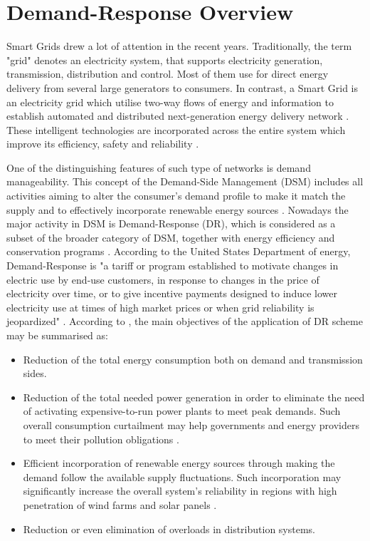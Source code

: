 \section{Demand-Response Overview}
Smart Grids drew a lot of attention in the recent years. Traditionally, the term "grid" denotes an electricity system, that supports electricity generation, transmission, distribution and control. Most of them use for direct energy delivery from several large generators to consumers. In contrast, a Smart Grid is an electricity grid which utilise two-way flows of energy and information to establish automated and distributed next-generation energy delivery network \cite{Fang2012}. These intelligent technologies are incorporated across the entire system which improve its efficiency, safety and reliability \cite{Gao2012}. 

One of the distinguishing features of such type of networks is demand manageability. This concept of the Demand-Side Management (DSM) includes all activities aiming to alter the consumer's demand profile to make it match the supply and to effectively incorporate renewable energy sources \cite{Alizadeh2012}. Nowadays the major activity in DSM is Demand-Response (DR), which is considered as a subset of the broader category of DSM, together with energy efficiency and conservation programs \cite{Palensky2011}. According to the United States Department of energy, Demand-Response is "a tariff or program established to motivate changes in electric use by end-use customers, in response to changes in the price of electricity over time, or to give incentive payments designed to induce lower electricity use at times of high market prices or when grid reliability is jeopardized" \cite{DepartmentofEnergyUSA2006}. According to \cite{Vardakas2015}, the main objectives of the application of DR scheme may be summarised as:
\begin{itemize}
    \item Reduction of the total energy consumption both on demand and transmission sides.
    \item Reduction of the total needed power generation in order to eliminate the need of activating expensive-to-run power plants to meet peak demands. Such overall consumption curtailment may help governments and energy providers to meet their pollution obligations \cite{DepartmentofEnergyUSA2006, Shishlov2016, UnitedNations/FrameworkConventiononClimateChange2015}.
    \item Efficient incorporation of renewable energy sources through making the demand follow the available supply fluctuations. Such incorporation may significantly increase the overall system's reliability in regions with high penetration of wind farms and solar panels \cite{Santacana2010}. 
    \item Reduction or even elimination of overloads in distribution systems.
\end{itemize} 

